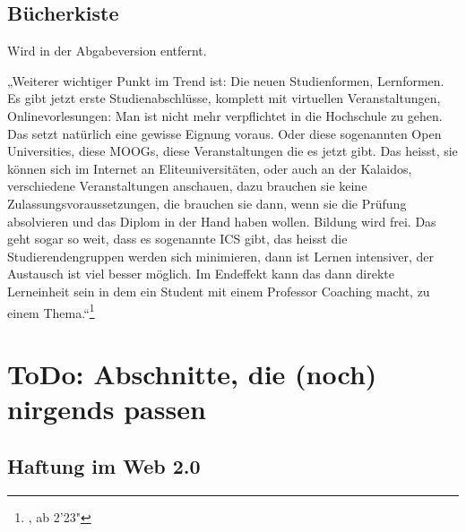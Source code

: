 

\subsection*{Bücherkiste} %
\label{sub:bucherkiste}

Wird in der Abgabeversion entfernt.

„Weiterer wichtiger Punkt im Trend ist: Die neuen Studienformen, Lernformen. Es gibt jetzt erste Studienabschlüsse, komplett mit virtuellen Veranstaltungen, Onlinevorlesungen: Man ist nicht mehr verpflichtet in die Hochschule zu gehen. Das setzt natürlich eine gewisse Eignung voraus. Oder diese sogenannten Open Universities, diese MOOGs, diese Veranstaltungen die es jetzt gibt. Das heisst, sie können sich im Internet an Eliteuniversitäten, oder auch an der Kalaidos, verschiedene Veranstaltungen anschauen, dazu brauchen sie keine Zulassungsvoraussetzungen, die brauchen sie dann, wenn sie die Prüfung absolvieren und das Diplom in der Hand haben wollen. Bildung wird frei. Das geht sogar so weit, dass es sogenannte ICS gibt, das heisst die Studierendengruppen werden sich minimieren, dann ist Lernen intensiver, der Austausch ist viel besser möglich. Im Endeffekt kann das dann direkte Lerneinheit sein in dem  ein Student mit einem Professor Coaching macht, zu einem Thema.“\footnote{\cite{roegner:trends}, ab 2'23"}


\section*{ToDo: Abschnitte, die (noch) nirgends passen} %
\label{sec:noch_ein_anhang}


\subsection*{Haftung im Web 2.0} %
\label{sub:haftung_im_web_2_0}




